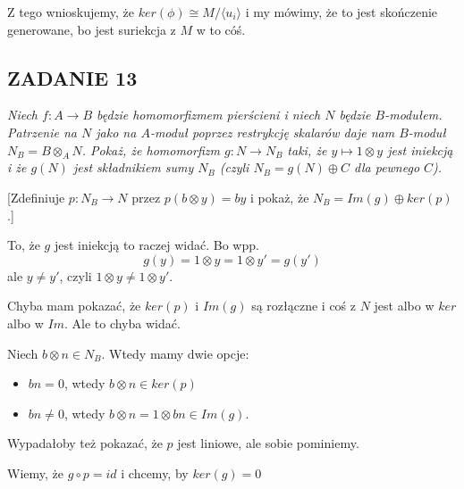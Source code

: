 \documentclass{article}
\begin{document}
Z tego wnioskujemy, że $ker(\phi)\cong M/\langle u_i\rangle$ i my mówimy, że to jest skończenie generowane, bo jest suriekcja z $M$ w to cóś.

\subsection*{ZADANIE 13}
{\slshape\color{blue}Niech $f:A\to B$ będzie homomorfizmem pierścieni i niech $N$ będzie $B$-modułem. Patrzenie na $N$ jako na $A$-moduł poprzez restrykcję skalarów daje nam $B$-moduł $N_B=B\otimes_AN$. Pokaż, że homomorfizm $g:N\to N_B$ taki, że $y\mapsto1\otimes y$ jest iniekcją i że $g(N)$ jest składnikiem sumy $N_B$ (czyli $N_B=g(N)\oplus C$ dla pewnego $C$).

[Zdefiniuje $p:N_B\to N$ przez $p(b\otimes y)=by$ i pokaż, że $N_B=Im(g)\oplus ker(p)$.]}

To, że $g$ jest iniekcją to raczej widać. Bo wpp. 
$$g(y)=1\otimes y=1\otimes y'=g(y')$$
ale $y\neq y'$, czyli $1\otimes y\neq 1\otimes y'$.

Chyba mam pokazać, że $ker(p)$ i $Im(g)$ są rozłączne i coś z $N$ jest albo w $ker$ albo w $Im$. Ale to chyba widać.

Niech $b\otimes n\in N_B$. Wtedy mamy dwie opcje:
\begin{itemize}
    \item $bn=0$, wtedy $b\otimes n\in ker(p)$
    \item $bn\neq 0$, wtedy $b\otimes n=1\otimes bn\in Im(g)$.
\end{itemize}

Wypadałoby też pokazać, że $p$ jest liniowe, ale sobie pominiemy.

Wiemy, że $g\circ p=id$ i chcemy, by $ker(g)=0$
\end{document}
